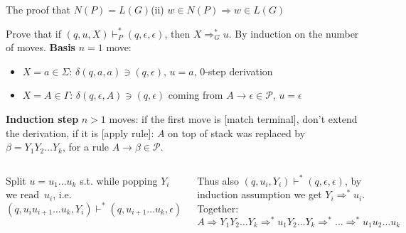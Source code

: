 \documentclass[handout]{beamer}
\begin{document}
\begin{frame}{The proof that $N(P)=L(G)$\hfill \alert{(ii) $w\in N(P)\Rightarrow w\in L(G)$}}

    \vspace{-3pt}
    Prove that if $(q,u,X)\vdash_P^*(q,\epsilon,\epsilon)$, then $X\Rightarrow_G^* u$. By induction on the number of moves. \textbf{Basis} \alert{$n=1$} move:
    \begin{itemize}
        \item $X=a\in\Sigma$: $\delta(q, a, a)\ni (q,\epsilon)$, $u=a$, 0-step derivation
        \item $X=A\in \Gamma$: $\delta(q,\epsilon,A)\ni (q,\epsilon)$ coming from $A\rightarrow\epsilon\in\mathcal P$, $u=\epsilon$
    \end{itemize} 

    \vspace{-3pt}
    \textbf{Induction step} \alert{$n>1$} moves: if the first move is \alert{[match terminal]}, don't extend the derivation, if it is \alert{[apply rule]}: $A$ on top of stack was replaced by $\beta=Y_1Y_2\ldots Y_k$, for a rule $A\to\beta\in\mathcal P$.

    \begin{columns}

    
        Split $u=u_1\ldots u_k$ s.t. while popping $Y_i$ we read~$u_i$, i.e. $(q,u_iu_{i+1}\ldots u_k,Y_i)\vdash^*(q,u_{i+1}\ldots u_k,\epsilon)$

        \medskip
        
        Thus also $(q,u_i,Y_i)\vdash^*(q,\epsilon,\epsilon)$, by induction assumption we get $Y_i\Rightarrow^*u_i$. Together:
        {\small
        $$
        A\Rightarrow Y_1Y_2\ldots Y_k\Rightarrow^* u_1Y_2\ldots Y_k\Rightarrow^* \ldots \Rightarrow^* u_1u_2\ldots u_k
        $$
        } 
        
        \vspace{-6pt}\hfill\qedsymbol
    

        \scalebox{0.85}{
            
        }
        
    \end{columns}    
       
\end{frame}
\end{document}
